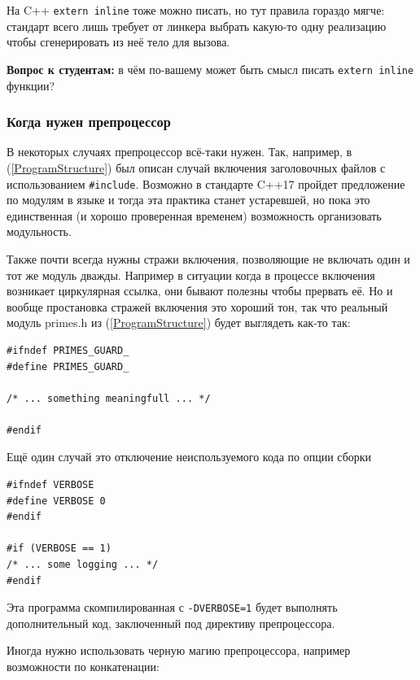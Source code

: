 \documentclass[a4paper,12pt,oneside]{article}
\newif\ifanswers
\begin{document}
На C++ \lstinline!extern inline! тоже можно писать, но тут правила гораздо мягче: стандарт всего лишь требует от линкера выбрать какую-то одну реализацию чтобы сгенерировать из неё тело для вызова.

\textbf{Вопрос к студентам:} в чём по-вашему может быть смысл писать \lstinline!extern inline! функции?

\ifanswers
Возможный ответ: семантика статических переменных -- внутри \lstinline!static inline! функций создается столько их копий сколько функций, внутри \lstinline!extern inline! копия одна на всех.
\fi

\subsubsection{Когда нужен препроцессор}

В некоторых случаях препроцессор всё-таки нужен. Так, например, в (\ref{ProgramStructure}) был описан случай включения заголовочных файлов с использованием \lstinline!#include!. Возможно в стандарте C++17 пройдет предложение по модулям в языке и тогда эта практика станет устаревшей, но пока это единственная (и хорошо проверенная временем) возможность организовать модульность.

Также почти всегда нужны стражи включения, позволяющие не включать один и тот же модуль дважды. Например в ситуации когда в процессе включения возникает циркулярная ссылка, они бывают полезны чтобы прервать её. Но и вообще простановка стражей включения это хороший тон, так что реальный модуль primes.h из (\ref{ProgramStructure}) будет выглядеть как-то так:

\begin{lstlisting}
#ifndef PRIMES_GUARD_
#define PRIMES_GUARD_

/* ... something meaningfull ... */

#endif
\end{lstlisting}

Ещё один случай это отключение неиспользуемого кода по опции сборки

\begin{lstlisting}
#ifndef VERBOSE
#define VERBOSE 0
#endif

#if (VERBOSE == 1)
/* ... some logging ... */
#endif
\end{lstlisting}

Эта программа скомпилированная с \lstinline!-DVERBOSE=1! будет выполнять дополнительный код, заключенный под директиву препроцессора.

Иногда нужно использовать черную магию препроцессора, например возможности по конкатенации:
\end{document}
